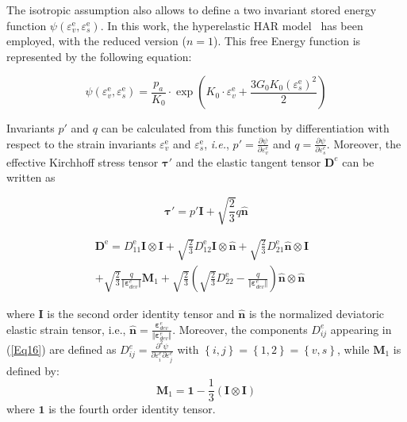 \documentclass[preprint,12pt,a4paper]{elsarticle}
\begin{document}
The isotropic assumption also allows to define a two invariant stored energy function $\psi\left(\varepsilon_{v}^{\mathrm{e}}, \varepsilon_{s}^{\mathrm{e}}\right)$. In this work, the hyperelastic HAR model~\cite{Houlsby2005} has been employed, with the reduced version ($n=1$). This free Energy function is represented by the following equation:

\begin{equation}
\psi\left(\varepsilon_{v}^{\mathrm{e}}, \varepsilon_{s}^{\mathrm{e}}\right)=\frac{p_{a}}{K_0} \cdot \exp \left(K_0 \cdot \varepsilon_{v}^{\mathrm{e}}+\frac{3 G_0 K_0\left(\varepsilon_{s}^{\mathrm{e}}\right)^{2}}{2}\right)\label{Eq14} 
\end{equation}

Invariants $p'$ and $q$ can be calculated from this function by differentiation with respect to the strain invariants $\varepsilon_{v}^{\mathrm{e}}$ and $\varepsilon_{s}^{\mathrm{e}}$, \textit{i.e.}, $p'=\frac{\partial \psi}{\partial \varepsilon_v^e}$ and $q=\frac{\partial \psi}{\partial \varepsilon_s^e}$. Moreover, the effective Kirchhoff stress tensor $\boldsymbol{\tau}'$ and the elastic tangent tensor $\boldsymbol{D}^e$ can be written as

\begin{equation}
\boldsymbol{\tau}'= p' \boldsymbol{I}+ \sqrt{\frac{2}{3}}q\hat{\boldsymbol{n}}
\label{Eq15} 
\end{equation}

\begin{eqnarray}
     \boldsymbol{D}^{\mathrm{e}} = D_{11}^{\mathrm{e}} \boldsymbol{I}\otimes \boldsymbol{I}+\sqrt{\frac{2}{3}} D_{12}^{\mathrm{e}} \boldsymbol{I} \otimes \hat{\boldsymbol{n}}+\sqrt{\frac{2}{3}} D_{21}^{\mathrm{e}} \hat{\boldsymbol{n}} \otimes \boldsymbol{I} &\nonumber\\ 
    +\sqrt{\frac{2}{3}}\frac{q}{\Vert\boldsymbol{\varepsilon}_{dev}^e\Vert} \mathbf{M}_1 +\sqrt{\frac{2}{3}}\left(\sqrt{\frac{2}{3}}  D_{22}^{\mathrm{e}} - \frac{q}{\Vert\boldsymbol{\varepsilon}_{dev}^e\Vert}\right)\hat{\boldsymbol{n}} \otimes \hat{\boldsymbol{n}}&
    \label{Eq16} 
\end{eqnarray}


where $\boldsymbol{I}$ is the second order identity tensor and $\hat{\boldsymbol{n}}$ is the normalized deviatoric elastic strain tensor, i.e., $\hat{\boldsymbol{n}}=\frac{\boldsymbol{\varepsilon}_{dev}^e}{\Vert\boldsymbol{\varepsilon}_{dev}^e\Vert}$. Moreover, the components $D^e_{ij}$ appearing in (\ref{Eq16}) are defined as $D^e_{ij}=\frac{\partial^2 \psi}{\partial \varepsilon_i^e \partial \varepsilon_j^e}$ with $\left \{i,j\right \}=\left \{1,2\right \}=\left \{v,s\right \}$, while $\mathbf{M}_1 $ is defined by:
\begin{equation}
\mathbf{M}_1 = \boldsymbol{1} - \frac{1}{3	}\left( \boldsymbol{I} \otimes \boldsymbol{I} \right)
\end{equation}
where $\boldsymbol{1}$ is the fourth order identity tensor. 
\end{document}
